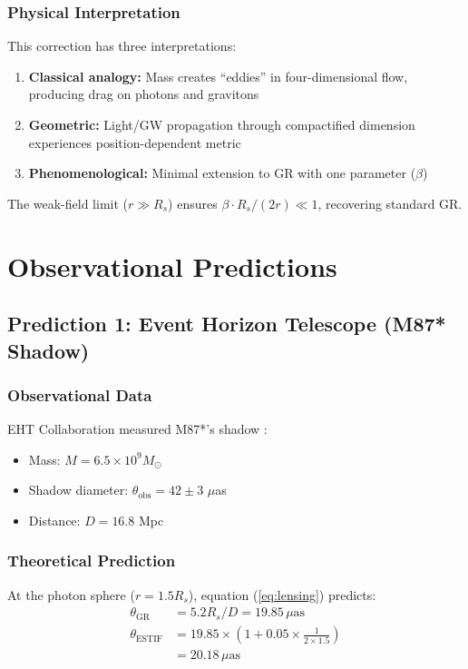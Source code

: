 \documentclass[12pt]{article}
\begin{document}
\subsubsection{Physical Interpretation}

This correction has three interpretations:
\begin{enumerate}
    \item \textbf{Classical analogy:} Mass creates ``eddies'' in four-dimensional flow, producing drag on photons and gravitons
    \item \textbf{Geometric:} Light/GW propagation through compactified dimension experiences position-dependent metric
    \item \textbf{Phenomenological:} Minimal extension to GR with one parameter ($\beta$)
\end{enumerate}

The weak-field limit ($r \gg R_s$) ensures $\beta \cdot R_s/(2r) \ll 1$, recovering standard GR.

\section{Observational Predictions}

\subsection{Prediction 1: Event Horizon Telescope (M87* Shadow)}

\subsubsection{Observational Data}

EHT Collaboration measured M87*'s shadow \cite{EHT2019}:
\begin{itemize}
    \item Mass: $M = 6.5 \times 10^9 M_\odot$
    \item Shadow diameter: $\theta_{\text{obs}} = 42 \pm 3$ $\mu$as
    \item Distance: $D = 16.8$ Mpc
\end{itemize}

\subsubsection{Theoretical Prediction}

At the photon sphere ($r = 1.5 R_s$), equation (\ref{eq:lensing}) predicts:
\begin{align}
\theta_{\text{GR}} &= 5.2 R_s / D = 19.85 \, \mu\text{as} \\
\theta_{\text{ESTIF}} &= 19.85 \times (1 + 0.05 \times \frac{1}{2 \times 1.5}) \\
&= 20.18 \, \mu\text{as}
\end{align}
\end{document}
